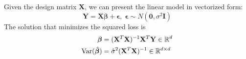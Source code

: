   \begin{theorem}
    Given the design matrix $\mathbf{X}$, we can present the linear model in vectorized form: 
    \begin{equation}
      \mathbf{Y} = \mathbf{X} \boldsymbol{\beta} + \boldsymbol{\epsilon}, \; \boldsymbol{\epsilon} \sim N(\mathbf{0}, \sigma^2 \mathbf{I})
    \end{equation}
    The solution that minimizes the squared loss is 
    \begin{align*}
      \boldsymbol{\beta} & = (\mathbf{X}^T \mathbf{X})^{-1} \mathbf{X}^T \mathbf{Y} \in \mathbb{R}^d \\
      \Var(\hat{\boldsymbol{\beta}}) & = \hat{\sigma}^2 (\mathbf{X}^T \mathbf{X})^{-1} \in \mathbb{R}^{d \times d}
    \end{align*}
  \end{theorem}
